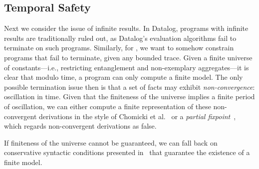 
%
%
%

\subsection{Temporal Safety}

Next we consider the issue of infinite results.  In Datalog, programs with
infinite results are traditionally ruled out, as Datalog's evaluation
algorithms fail to terminate on such programs.  Similarly, for \lang, we want
to somehow constrain programs that fail to terminate, given any bounded
trace.
Given a finite universe of constants---i.e., restricting entanglement and
non-exemplary aggregates---it is clear that modulo time, a \lang program can
only compute a finite model.  The only possible termination issue then is that
a set of facts may exhibit {\em non-convergence}: oscillation in time.  Given
that the finiteness of the universe implies a finite period of oscillation, we
can either compute a finite representation of these non-convergent derivations
in the style of Chomicki et al.~\cite{chomicki-infinite} or a {\em partial
fixpoint}~\cite{abiteboul-vianu}, which regards non-convergent derivations as
false.

If finiteness of the universe cannot be guaranteed, we can fall back on
conservative syntactic conditions presented in~\cite{dedalus-techr} that
guarantee the existence of a finite model.


